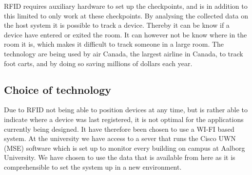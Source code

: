 RFID requires auxiliary hardware to set up the checkpoints, and is in addition to this limited to only work at these checkpoints. By analysing the collected data on the host system it is possible to track a device. Thereby it can be know if a device have entered or exited the room. It can however not be know where in the room it is, which makes it difficult to track someone in a large room.
The technology are being used by air Canada, the largest airline in Canada, to track foot carts, and by doing so saving millions of dollars each year\cite{RFIDjournal}.




\subsection{Choice of technology}\label{subsec:cisco}
Due to RFID not being able to position devices at any time, but is rather able to indicate where a device was last registered, it is not optimal for the applications currently being designed. It have therefore been chosen to use a WI-FI based system.
At the university we have access to a sever that runs the Cisco UWN (MSE) software which is set up to monitor every building on campus at Aalborg University. We have chosen to use the data that is available from here as it is comprehensible to set the system up in a new environment.

